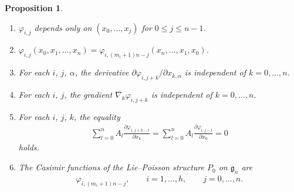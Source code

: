 \documentclass[10pt,a4paper]{amsart}
\numberwithin{equation}{section}
\newtheorem{Proposition}[Theorem]{Proposition}
 { \theoremstyle{definition}
\newtheorem{Example}[Theorem]{Example}}
\begin{document}
\begin{Proposition}\label{proposition2.1}\quad
\begin{enumerate}\itemsep=0pt
\item[$(i)$] $\varphi _{i,j}$ depends only on $(x_0, \dots ,x_j)$ for $0\leq j\leq n-1$.
\item[$(ii)$] $\varphi _{i,j}(x_0, x_1,\dots ,x_n) = \varphi _{i, (m_i+1)n-j} (x_n, \dots ,x_1,x_0)$.
\item[$(iii)$] For each $i$, $j$, $\alpha $, the derivative $\partial \varphi _{i,j+k}/\partial x_{k,\alpha }$ is independent of $k=0,\dots ,n$.
\item[$(iv)$] For each $i$, $j$, the gradient $\nabla _k \varphi _{i,j+k}$ is independent of $k=0,\dots ,n$.
\item[$(v)$] For each $i$, $j$, $k$, the equality
\begin{gather*}
\sum^n_{l=0}A_l \frac{\partial \varphi _{i,j+k-l}}{\partial x_k}
 = \sum^n_{l=0}A_l \frac{\partial \varphi _{i,j-l}}{\partial x_0} = 0
\end{gather*}
holds.
\item[$(vi)$] The Casimir functions of the Lie--Poisson structure $P_0$ on $\mathfrak{g}_n$ are
\begin{gather*}
\varphi _{i,(m_i+1)n-j}, \qquad i=1,\dots ,h,\qquad j=0,\dots ,n.
\end{gather*}
\end{enumerate}
\end{Proposition}
\end{document}
